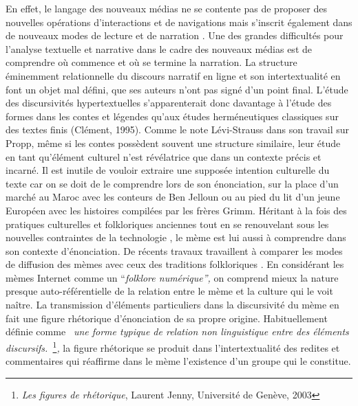 En effet, le langage des nouveaux m\'edias ne se contente pas de proposer des nouvelles op\'erations d{\textquoteright}interactions et de navigations mais s{\textquoteright}inscrit \'egalement dans de nouveaux modes de lecture et de narration \cite{Manovich2001}. Une des grandes difficult\'es pour l{\textquoteright}analyse textuelle et narrative dans le cadre des nouveaux m\'edias est de comprendre o\`u commence et o\`u se termine la narration. La structure \'eminemment relationnelle du discours narratif en ligne et son intertextualit\'e en font un objet mal d\'efini, que ses auteurs n{\textquoteright}ont pas sign\'e d{\textquoteright}un point final. L{\textquoteright}\'etude des discursivit\'es hypertextuelles s{\textquoteright}apparenterait donc davantage \`a l{\textquoteright}\'etude des formes dans les contes et l\'egendes qu{\textquoteright}aux \'etudes herm\'eneutiques classiques sur des textes finis (Cl\'ement, 1995). Comme le note L\'evi-Strauss dans son travail sur Propp, m\^eme si les contes poss\`edent souvent une structure similaire, leur \'etude en tant qu{\textquoteright}\'el\'ement culturel n{\textquoteright}est r\'ev\'elatrice que dans un contexte pr\'ecis et incarn\'e. Il est inutile de vouloir extraire une suppos\'ee intention culturelle du texte car on se doit de le comprendre lors de son \'enonciation, sur la place d{\textquoteright}un march\'e au Maroc avec les conteurs de Ben Jelloun ou au pied du lit d{\textquoteright}un jeune Europ\'een avec les histoires compil\'ees par les fr\`eres Grimm. H\'eritant \`a la fois des pratiques culturelles et folkloriques anciennes tout en se renouvelant sous les nouvelles contraintes de la technologie \cite{Barber2008}, le m\`eme est lui aussi \`a comprendre dans son contexte d{\textquoteright}\'enonciation. De r\'ecents travaux travaillent \`a comparer les modes de diffusion des m\`emes avec ceux des traditions folkloriques \cite{De Seta2014}. En consid\'erant les m\`emes Internet comme un {\textquotedblleft}\textit{folklore num\'erique{\textquotedblright}, }on comprend mieux la nature presque auto-r\'ef\'erentielle de la relation entre le m\`eme et la culture qui le voit na\^itre. La transmission d{\textquoteright}\'el\'ements particuliers dans la discursivit\'e du m\`eme en fait une figure rh\'etorique d{\textquoteright}\'enonciation de sa propre origine. Habituellement d\'efinie comme \textit{{\guillemotleft}~une forme typique de relation non linguistique entre des \'el\'ements discursifs.~{\guillemotright}}\footnote{ \textit{Les figures de rh\'etorique}, Laurent Jenny, Universit\'e de Gen\`eve, 2003}\textit{, }la figure rh\'etorique se produit dans l{\textquoteright}intertextualit\'e des redites et commentaires qui r\'eaffirme dans le m\`eme l{\textquoteright}existence d{\textquoteright}un groupe qui le constitue.  

